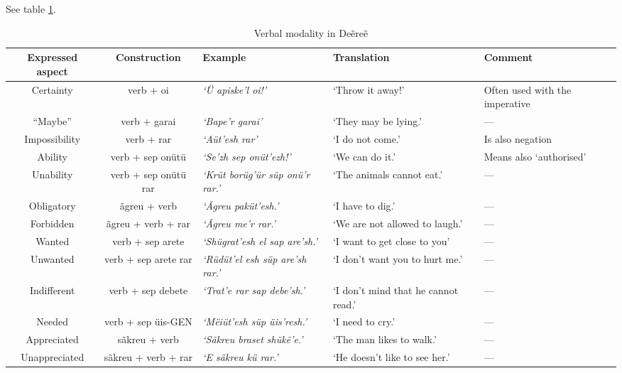 See table \ref{tab:verbal-modality}.

\begin{table}[h]
\begin{tabular}{|c|c|p{3cm}|p{3cm}|p{3cm}|}\hline
\textbf{Expressed aspect} & \textbf{Construction} & \textbf{Example} & \textbf{Translation} & \textbf{Comment} \\\hline\hline
Certainty & verb + oi & \emph{‘Ü apiske’l oi!’} & ‘Throw it away!’ & Often used with the imperative \\\hline
“Maybe” & verb + garai & \emph{‘Bape’r garai’} & ‘They may be lying.’ & — \\\hline
Impossibility & verb + rar & \emph{‘Aüt’esh rar’} & ‘I do not come.’ & Is also negation \\\hline
\hline
Ability & verb + sep onütü & \emph{‘Se’zh sep onüt’ezh!’} & ‘We can do it.’ & Means also ‘authorised’ \\\hline
Unability & verb + sep onütü rar & \emph{‘Krüt borüg’ür süp onü’r rar.’} & ‘The animals cannot eat.’ & — \\\hline
\hline
Obligatory & ãgreu + verb & \emph{‘Ãgreu paküt’esh.’} & ‘I have to dig.’ & — \\\hline
Forbidden & ãgreu + verb + rar & \emph{‘Ãgreu me’r rar.’} & ‘We are not allowed to laugh.’ & — \\\hline
\hline
Wanted & verb + sep arete & \emph{‘Shügrat’esh el sap are’sh.’} & ‘I want to get close to you’ & — \\\hline
Unwanted & verb + sep arete rar & \emph{‘Rüdüt’el esh süp are’sh rar.’} & ‘I don’t want you to hurt me.’ & — \\\hline
Indifferent & verb + sep debete & \emph{‘Trat’e rar sap debe’sh.’} & ‘I don’t mind that he cannot read.’ & — \\\hline
Needed & verb + sep üis-\textsc{GEN} & \emph{‘Mëiüt’esh süp üis’resh.’} & ‘I need to cry.’ & — \\\hline
\hline
Appreciated & sãkreu + verb & \emph{‘Sãkreu braset shükẽ’e.’} & ‘The man likes to walk.’ & — \\\hline
Unappreciated & sãkreu + verb + rar & \emph{‘E sãkreu kü rar.’} & ‘He doesn’t like to see her.’ & — \\\hline
\end{tabular}
\caption{Verbal modality in Deẽreẽ}
\label{tab:verbal-modality}
\end{table}

